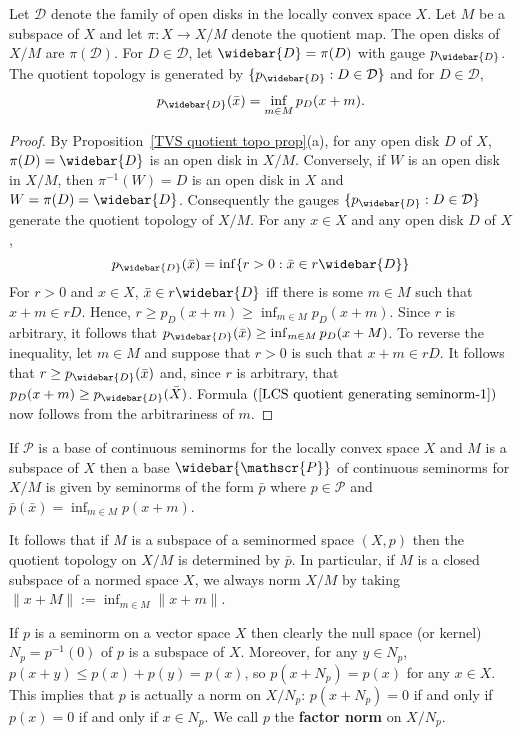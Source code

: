 \begin{proposition}\label{LCS quotient generating seminorm}
Let $\mathcal{D}$ denote the family of open disks in the locally convex space $X$. Let $M$ be a subspace of $X$ and let $\pi:X\to X/M$ denote the quotient map. The open disks of $X/M$ are $\pi(\mathcal{D})$. For $D\in\mathcal{D}$, let $\widebar{D}=\pi(D)$ with gauge $p_{\widebar{D}}$. The quotient topology is generated by $\{p_{\widebar{D}}:D\in\mathcal{D}\}$ and for $D\in\mathcal{D}$,
\begin{align}\label{LCS quotient generating seminorm-1}
p_{\widebar{D}}(\bar{x})=\inf_{m\in M}p_D(x+m).
\end{align}
\end{proposition}
\begin{proof}
By Proposition~\ref{TVS quotient topo prop}(a), for any open disk $D$ of $X$, $\pi(D)=\widebar{D}$ is an open disk in $X/M$. Conversely, if $W$ is an open disk in $X/M$, then $\pi^{-1}(W)=D$ is an open disk in $X$ and $W=\pi(D)=\widebar{D}$. Consequently the gauges $\{p_{\widebar{D}}:D\in\mathcal{D}\}$ generate the quotient topology of $X/M$. For any $x\in X$ and any open disk $D$ of $X$,
\[p_{\widebar{D}}(\bar{x})=\inf\{r>0:\bar{x}\in r\widebar{D}\}\]
For $r>0$ and $x\in X$, $\bar{x}\in r\widebar{D}$ iff there is some $m\in M$ such that $x+m\in rD$. Hence, $r\geq p_D(x+m)\geq\inf_{m\in M}p_D(x+m)$. Since $r$ is arbitrary, it follows that $p_{\widebar{D}}(\bar{x})\geq\inf_{m\in M}p_D(x+M)$. To reverse the inequality, let $m\in M$ and suppose that $r>0$ is such that $x+m\in rD$. It follows that $r\geq p_{\widebar{D}}(\bar{x})$ and, since $r$ is arbitrary, that $p_D(x+m)\geq p_{\widebar{D}}(\bar{X})$. Formula $(\ref{LCS quotient generating seminorm-1})$ now follows from the arbitrariness of $m$.
\end{proof}
\begin{proposition}
If $\mathscr{P}$ is a base of continuous seminorms for the locally convex space $X$ and $M$ is a subspace of $X$ then a base $\widebar{\mathscr{P}}$ of continuous seminorms for $X/M$ is given by seminorms of the form $\bar{p}$ where $p\in\mathscr{P}$ and $\bar{p}(\bar{x})=\inf_{m\in M}p(x+m)$.
\end{proposition}
It follows that if $M$ is a subspace of a seminormed space $(X,p)$ then the quotient topology on $X/M$ is determined by $\bar{p}$. In particular, if $M$ is a closed subspace of a normed space $X$, we always norm $X/M$ by taking $\|x+M\|:=\inf_{m\in M}\|x+m\|$.\par
If $p$ is a seminorm on a vector space $X$ then clearly the null space (or
kernel) $N_p=p^{-1}(0)$ of $p$ is a subspace of $X$. Moreover, for any $y\in N_p$, $p(x+y)\leq p(x)+p(y)=p(x)$, so $p(x+N_p)=p(x)$ for any $x\in X$. This implies that $p$ is actually a norm on $X/N_p$: $p(x+N_p)=0$ if and only if $p(x)=0$ if and only if $x\in N_p$. We call $p$ the \textbf{factor norm} on $X/N_p$.
